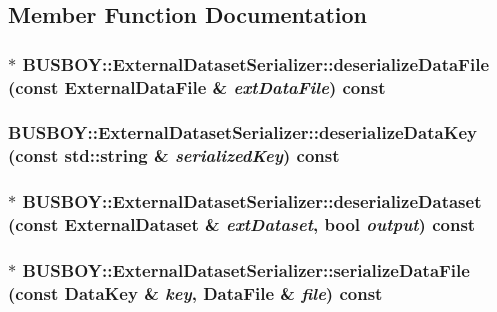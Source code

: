 \subsection{Member Function Documentation}
\hypertarget{classBUSBOY_1_1ExternalDatasetSerializer_abb5a5f3669af41ab9825c12ba14f53b9}{
\subsubsection[{deserializeDataFile}]{ $\ast$ BUSBOY::ExternalDatasetSerializer::deserializeDataFile (const {\bf ExternalDataFile} \& {\em extDataFile}) const}}
\label{classBUSBOY_1_1ExternalDatasetSerializer_abb5a5f3669af41ab9825c12ba14f53b9}
\hypertarget{classBUSBOY_1_1ExternalDatasetSerializer_aa7fd50e00dfb3a45f32444f3fb5734fa}{
\subsubsection[{deserializeDataKey}]{ BUSBOY::ExternalDatasetSerializer::deserializeDataKey (const std::string \& {\em serializedKey}) const}}
\label{classBUSBOY_1_1ExternalDatasetSerializer_aa7fd50e00dfb3a45f32444f3fb5734fa}
\hypertarget{classBUSBOY_1_1ExternalDatasetSerializer_a6f9fc6de312044bd344457e901142dc9}{
\subsubsection[{deserializeDataset}]{ $\ast$ BUSBOY::ExternalDatasetSerializer::deserializeDataset (const {\bf ExternalDataset} \& {\em extDataset}, \/  bool {\em output}) const}}
\label{classBUSBOY_1_1ExternalDatasetSerializer_a6f9fc6de312044bd344457e901142dc9}
\hypertarget{classBUSBOY_1_1ExternalDatasetSerializer_a7f11a3e1bdb20867ffa58d64c6757c1d}{
\subsubsection[{serializeDataFile}]{ $\ast$ BUSBOY::ExternalDatasetSerializer::serializeDataFile (const {\bf DataKey} \& {\em key}, \/  {\bf DataFile} \& {\em file}) const}}
